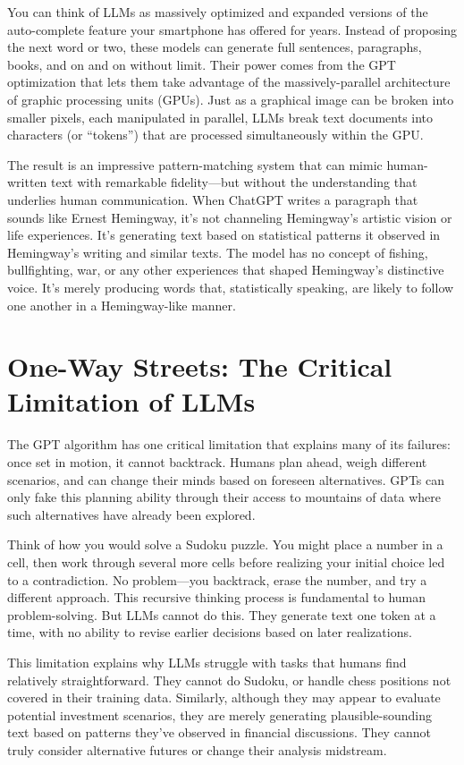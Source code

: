 \documentclass[
  Letterpaper,
]{scrbook}
\begin{document}
You can think of LLMs as massively optimized and expanded versions of
the auto-complete feature your smartphone has offered for years. Instead
of proposing the next word or two, these models can generate full
sentences, paragraphs, books, and on and on without limit. Their power
comes from the GPT optimization that lets them take advantage of the
massively-parallel architecture of graphic processing units (GPUs). Just
as a graphical image can be broken into smaller pixels, each manipulated
in parallel, LLMs break text documents into characters (or ``tokens'')
that are processed simultaneously within the GPU.

The result is an impressive pattern-matching system that can mimic
human-written text with remarkable fidelity---but without the
understanding that underlies human communication. When ChatGPT writes a
paragraph that sounds like Ernest Hemingway, it's not channeling
Hemingway's artistic vision or life experiences. It's generating text
based on statistical patterns it observed in Hemingway's writing and
similar texts. The model has no concept of fishing, bullfighting, war,
or any other experiences that shaped Hemingway's distinctive voice. It's
merely producing words that, statistically speaking, are likely to
follow one another in a Hemingway-like manner.

\section{One-Way Streets: The Critical Limitation of
LLMs}\label{one-way-streets-the-critical-limitation-of-llms}

The GPT algorithm has one critical limitation that explains many of its
failures: once set in motion, it cannot backtrack. Humans plan ahead,
weigh different scenarios, and can change their minds based on foreseen
alternatives. GPTs can only fake this planning ability through their
access to mountains of data where such alternatives have already been
explored.

Think of how you would solve a Sudoku puzzle. You might place a number
in a cell, then work through several more cells before realizing your
initial choice led to a contradiction. No problem---you backtrack, erase
the number, and try a different approach. This recursive thinking
process is fundamental to human problem-solving. But LLMs cannot do
this. They generate text one token at a time, with no ability to revise
earlier decisions based on later realizations.

This limitation explains why LLMs struggle with tasks that humans find
relatively straightforward. They cannot do Sudoku, or handle chess
positions not covered in their training data. Similarly, although they
may appear to evaluate potential investment scenarios, they are merely
generating plausible-sounding text based on patterns they've observed in
financial discussions. They cannot truly consider alternative futures or
change their analysis midstream.
\end{document}
